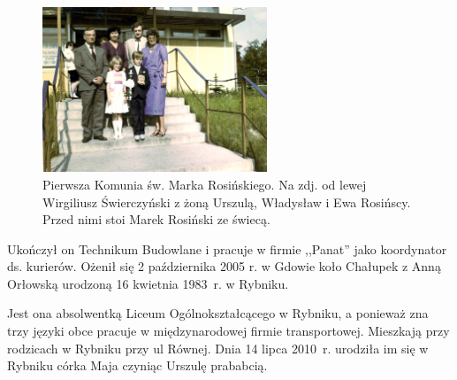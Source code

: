 \begin{figure}[!h]
\begin{center}
\includegraphics[width=0.6\textwidth]{photo/marek_rosinski_komunia.jpg}
\caption[Pierwsza Komunia św. Marka Rosińskiego]{Pierwsza Komunia św. Marka Rosińskiego. Na zdj. od lewej Wirgiliusz Świerczyński z żoną Urszulą, Władysław i Ewa Rosińscy. Przed nimi stoi Marek Rosiński ze świecą.}
\label{rys:marek_rosinski_komunia}
\end{center}
\end{figure}

Ukończył on Technikum Budowlane i pracuje w firmie ,,Panat'' jako koordynator ds. kurierów. Ożenił się 2 października 2005 r. w Gdowie koło Chałupek z Anną Orłowską urodzoną 16 kwietnia 1983~r. w Rybniku.

Jest ona absolwentką Liceum Ogólnokształcącego w Rybniku, a ponieważ zna trzy języki obce pracuje w międzynarodowej firmie transportowej. Mieszkają przy rodzicach w Rybniku przy ul Równej. Dnia 14 lipca 2010~r. urodziła im się w Rybniku córka Maja czyniąc Urszulę prababcią.